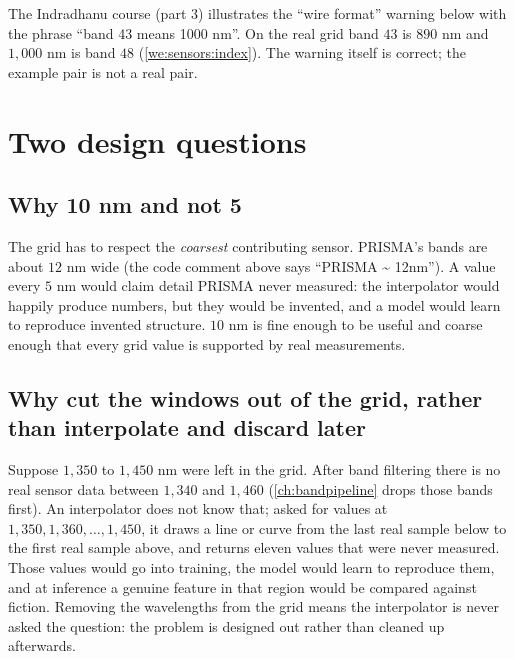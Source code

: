 \begin{sourcenote}
The Indradhanu course (part 3) illustrates the ``wire format'' warning below with the phrase
``band 43 means 1000 nm''. On the real grid band $43$ is $890$ nm and $1{,}000$ nm is band $48$
(\cref{we:sensors:index}). The warning itself is correct; the example pair is not a real pair.
\end{sourcenote}

\section{Two design questions}\label{sec:sensors:why}

\subsection{Why 10 nm and not 5}

The grid has to respect the \emph{coarsest} contributing sensor. PRISMA's bands are about $12$ nm
wide (the code comment above  says ``PRISMA \textasciitilde
12nm''). A value every $5$ nm would claim detail PRISMA never measured: the interpolator would
happily produce numbers, but they would be invented, and a model would learn to reproduce invented
structure. $10$ nm is fine enough to be useful and coarse enough that every grid value is
supported by real measurements.

\subsection{Why cut the windows out of the grid, rather than interpolate and discard later}

Suppose $1{,}350$ to $1{,}450$ nm were left in the grid. After band filtering there is no
real sensor data between $1{,}340$ and $1{,}460$ (\cref{ch:bandpipeline} drops those bands first).
An interpolator does not know that; asked for values at $1{,}350, 1{,}360, \dots, 1{,}450$, it
draws a line or curve from the last real sample below to the first real sample above, and returns
eleven values that were never measured. Those values would go into training, the model would learn
to reproduce them, and at inference a genuine feature in that region would be compared against
fiction. Removing the wavelengths from the grid means the interpolator is never asked the
question: the problem is designed out rather than cleaned up afterwards.

